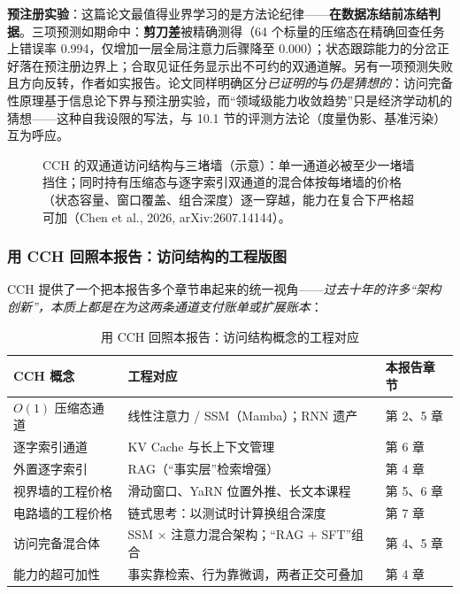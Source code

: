 \documentclass[12pt,a4paper]{article}
\begin{document}
\textbf{预注册实验}：这篇论文最值得业界学习的是方法论纪律——\textbf{在数据冻结前冻结判据}。三项预测如期命中：\textbf{剪刀差}被精确测得（64 个标量的压缩态在精确回查任务上错误率 0.994，仅增加一层全局注意力后骤降至 0.000）；状态跟踪能力的分岔正好落在预注册边界上；合取见证任务显示出不可约的双通道解。另有一项预测失败且方向反转，作者如实报告。论文同样明确区分\emph{已证明的}与\emph{仍是猜想的}：访问完备性原理基于信息论下界与预注册实验，而“领域级能力收敛趋势”只是经济学动机的猜想——这种自我设限的写法，与 10.1 节的评测方法论（度量伪影、基准污染）互为呼应。

\begin{figure}[htbp]
\centering
\resizebox{0.97\textwidth}{!}{%

}%
\caption{CCH 的双通道访问结构与三堵墙（示意）：单一通道必被至少一堵墙挡住；同时持有压缩态与逐字索引双通道的混合体按每堵墙的价格（状态容量、窗口覆盖、组合深度）逐一穿越，能力在复合下严格超可加（Chen et al., 2026, arXiv:2607.14144）。}
\label{fig:cch}
\end{figure}

\subsubsection{用 CCH 回照本报告：访问结构的工程版图}

CCH 提供了一个把本报告多个章节串起来的统一视角——\emph{过去十年的许多“架构创新”，本质上都是在为这两条通道支付账单或扩展账本}：

\begin{table}[htbp]
\centering\small
\begin{tabular}{@{}lll@{}}
\toprule
\textbf{CCH 概念} & \textbf{工程对应} & \textbf{本报告章节}\\
\midrule
$O(1)$ 压缩态通道 & 线性注意力 / SSM（Mamba）；RNN 遗产 & 第 2、5 章\\
逐字索引通道 & KV Cache 与长上下文管理 & 第 6 章\\
外置逐字索引 & RAG（“事实层”检索增强） & 第 4 章\\
视界墙的工程价格 & 滑动窗口、YaRN 位置外推、长文本课程 & 第 5、6 章\\
电路墙的工程价格 & 链式思考：以测试时计算换组合深度 & 第 7 章\\
访问完备混合体 & SSM $\times$ 注意力混合架构；“RAG $+$ SFT”组合 & 第 4、5 章\\
能力的超可加性 & 事实靠检索、行为靠微调，两者正交可叠加 & 第 4 章\\
\bottomrule
\end{tabular}
\caption{用 CCH 回照本报告：访问结构概念的工程对应}
\label{tab:cchmap}
\end{table}
\end{document}
